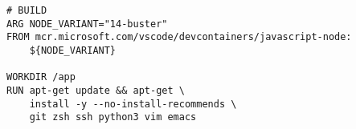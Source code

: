 
\begin{lstlisting}[language=docker, frame=single, caption={NodeJS DevContainer Dockerfile},label=code::docker_dev_node]
# BUILD
ARG NODE_VARIANT="14-buster"
FROM mcr.microsoft.com/vscode/devcontainers/javascript-node:
    ${NODE_VARIANT}

WORKDIR /app
RUN apt-get update && apt-get \
    install -y --no-install-recommends \
    git zsh ssh python3 vim emacs
\end{lstlisting}

